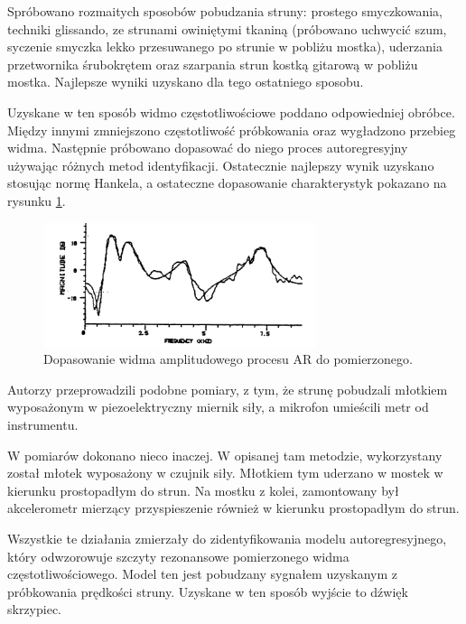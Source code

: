 Spróbowano rozmaitych sposobów pobudzania struny: prostego smyczkowania, techniki glissando, ze strunami owiniętymi tkaniną (próbowano uchwycić szum, syczenie smyczka lekko przesuwanego po strunie w pobliżu mostka), uderzania przetwornika śrubokrętem oraz szarpania strun kostką gitarową w pobliżu mostka. Najlepsze wyniki uzyskano dla tego ostatniego sposobu.

Uzyskane w ten sposób widmo częstotliwościowe poddano odpowiedniej obróbce. Między innymi zmniejszono częstotliwość próbkowania oraz wygładzono przebieg widma. Następnie próbowano dopasować do niego proces autoregresyjny używając różnych metod identyfikacji. Ostatecznie najlepszy wynik uzyskano stosując normę Hankela, a ostateczne dopasowanie charakterystyk pokazano na rysunku \ref{rys:hankel}.

\begin{figure}[H]
	\centering
	\includegraphics[width=8cm]{grafiki/hankel}
	\captionsetup{justification=centering}
	\caption{Dopasowanie widma amplitudowego procesu AR do pomierzonego.}
	\label{rys:hankel}
\end{figure}

Autorzy \cite{bowed_4} przeprowadzili podobne pomiary, z tym, że strunę pobudzali młotkiem wyposażonym w piezoelektryczny miernik siły, a mikrofon umieścili metr od instrumentu.

W \cite{bowed_2} pomiarów dokonano nieco inaczej. W opisanej tam metodzie, wykorzystany został młotek wyposażony w czujnik siły. Młotkiem tym uderzano w mostek w kierunku prostopadłym do strun. Na mostku z kolei, zamontowany był akcelerometr mierzący przyspieszenie również w kierunku prostopadłym do strun.

Wszystkie te działania zmierzały do zidentyfikowania modelu autoregresyjnego, który odwzorowuje szczyty rezonansowe pomierzonego widma częstotliwościowego. Model ten jest pobudzany sygnałem uzyskanym z próbkowania prędkości struny. Uzyskane w ten sposób wyjście to dźwięk skrzypiec.
